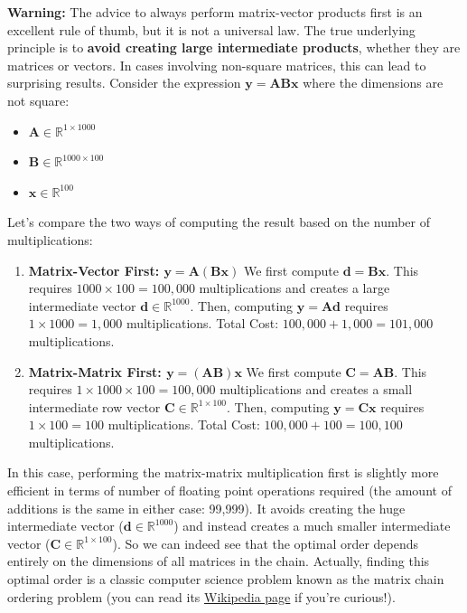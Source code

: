 \begin{warningBox} 
    \textbf{Warning:} The advice to always perform matrix-vector products first is an excellent rule of thumb, but it is not a universal law. The true underlying principle is to \textbf{avoid creating large intermediate products}, whether they are matrices or vectors. In cases involving non-square matrices, this can lead to surprising results. Consider the expression $\mathbf{y} = \mathbf{A}\mathbf{B}\mathbf{x}$ where the dimensions are not square:
    \begin{itemize} 
        \item $\mathbf{A} \in \mathbb{R}^{1 \times 1000}$ 
        \item $\mathbf{B} \in \mathbb{R}^{1000 \times 100}$ 
        \item $\mathbf{x} \in \mathbb{R}^{100}$ 
    \end{itemize} 
    Let's compare the two ways of computing the result based on the number of multiplications: 
    \begin{enumerate} 
        \item \textbf{Matrix-Vector First: $\mathbf{y} = \mathbf{A}(\mathbf{B}\mathbf{x})$} 
        We first compute $\mathbf{d} = \mathbf{B}\mathbf{x}$. This requires $1000 \times 100 = 100,000$ multiplications and creates a large intermediate vector $\mathbf{d} \in \mathbb{R}^{1000}$. Then, computing $\mathbf{y} = \mathbf{A}\mathbf{d}$ requires $1 \times 1000 = 1,000$ multiplications. Total Cost: $100,000 + 1,000 = 101,000$ multiplications. 
        \item \textbf{Matrix-Matrix First: $\mathbf{y} = (\mathbf{A}\mathbf{B})\mathbf{x}$} We first compute $\mathbf{C} = \mathbf{A}\mathbf{B}$. This requires $1 \times 1000 \times 100 = 100,000$ multiplications and creates a small intermediate row vector $\mathbf{C} \in \mathbb{R}^{1 \times 100}$. Then, computing $\mathbf{y} = \mathbf{C}\mathbf{x}$ requires $1 \times 100 = 100$ multiplications. Total Cost: $100,000 + 100 = 100,100$ multiplications. 
    \end{enumerate} 
    In this case, performing the matrix-matrix multiplication first is slightly more efficient in terms of number of floating point operations required (the amount of additions is the same in either case: 99,999). It avoids creating the huge intermediate vector ($\mathbf{d} \in \mathbb{R}^{1000}$) and instead creates a much smaller intermediate vector ($\mathbf{C} \in \mathbb{R}^{1 \times 100}$). So we can indeed see that the optimal order depends entirely on the dimensions of all matrices in the chain. Actually, finding this optimal order is a classic computer science problem known as the matrix chain ordering problem (you can read its \href{https://en.wikipedia.org/wiki/Matrix_chain_multiplication}{Wikipedia page} if you're curious!).
\end{warningBox}

